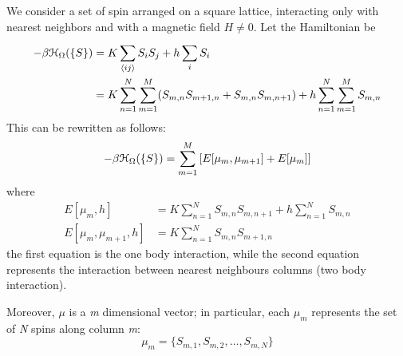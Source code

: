 \documentclass[../main/main.tex]{subfiles}
\begin{document}
We consider a set of spin arranged on a square lattice, interacting only with nearest neighbors and with a magnetic field \(H  \neq 0 \). 
Let the Hamiltonian be
\begin{equation*}
\begin{split}
  -\beta \mathcal{H}_ \Omega  ( \{ S \}  ) &= K \sum_{\expval{ij} }^{} S_i S_j + h \sum_{i}^{} S_i  \\
  & = K \sum_{n=1}^{N} \sum_{m=1}^{M} (S_{m,n} S_{m+1,n}+S_{m,n}S_{m,n+1}) + h \sum_{n=1}^{N} \sum_{m=1}^{M} S_{m,n}
\end{split}
\end{equation*}
This can be rewritten as follows:
\begin{equation}
  -\beta \mathcal{H}_ \Omega  ( \{ S \}  ) = \sum_{m=1}^{M} \qty[E[\mu _m, \mu _{m+1}] + E[\mu _m]]
\end{equation}
where 
\begin{subequations}
\begin{align}
E [ \mu _m,h] &= K \sum_{n=1}^{N} S_{m,n} S_{m,n+1} + h \sum_{n=1}^{N} S_{m,n} \\
  E [\mu _m, \mu _{m+1},h] & = K \sum_{n=1}^{N} S_{m,n} S_{m+1,n}
\end{align}
\end{subequations}
the first equation is the one body interaction, while the second equation represents the interaction between nearest neighbours columns (two body interaction).

Moreover, \( \mu  \)  is a \emph{m} dimensional vector; in particular, each \( \mu _m \) represents the set of \emph{N} spins along column \emph{m}:
\begin{equation}
  \mu _m = \{ S_{m,1}, S_{m,2}, \dots, S_{m,N} \}
  \label{eq:9_1}
\end{equation}
\end{document}
